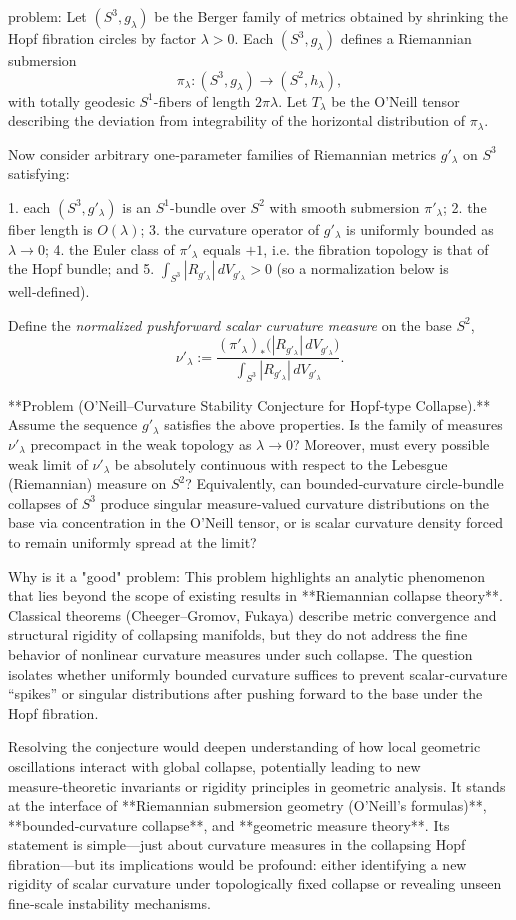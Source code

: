 problem:  
Let \( (S^3,g_\lambda) \) be the Berger family of metrics obtained by shrinking the Hopf fibration circles by factor \(\lambda>0\).  
Each \( (S^3,g_\lambda)\) defines a Riemannian submersion
\[
\pi_\lambda:(S^3,g_\lambda)\to (S^2,h_\lambda),
\]
with totally geodesic \(S^1\)-fibers of length \(2\pi\lambda\).  Let \(T_\lambda\) be the O’Neill tensor describing the deviation from integrability of the horizontal distribution of \(\pi_\lambda\).

Now consider arbitrary one‑parameter families of Riemannian metrics \(g'_\lambda\) on \(S^3\) satisfying:

1. each \( (S^3,g'_\lambda)\) is an \(S^1\)-bundle over \(S^2\) with smooth submersion \(\pi'_\lambda\);  
2. the fiber length is \(O(\lambda)\);  
3. the curvature operator of \(g'_\lambda\) is uniformly bounded as \(\lambda\to0\);  
4. the Euler class of \(\pi'_\lambda\) equals \(+1\), i.e. the fibration topology is that of the Hopf bundle; and  
5. \(\int_{S^3} |R_{g'_\lambda}|\,dV_{g'_\lambda} > 0\) (so a normalization below is well‑defined).

Define the \emph{normalized pushforward scalar curvature measure} on the base \(S^2\),
\[
\nu'_\lambda := 
\frac{(\pi'_\lambda)_*\!\big(|R_{g'_\lambda}|\,dV_{g'_\lambda}\big)}
      {\int_{S^3} |R_{g'_\lambda}|\,dV_{g'_\lambda}}.
\]

**Problem (O’Neill–Curvature Stability Conjecture for Hopf‑type Collapse).**  
Assume the sequence \(g'_\lambda\) satisfies the above properties.  
Is the family of measures \(\nu'_\lambda\) precompact in the weak topology as \(\lambda\to0\)?  
Moreover, must every possible weak limit of \(\nu'_\lambda\) be absolutely continuous with respect to the Lebesgue (Riemannian) measure on \(S^2\)?  
Equivalently, can bounded‑curvature circle‑bundle collapses of \(S^3\) produce singular measure‑valued curvature distributions on the base via concentration in the O’Neill tensor, or is scalar curvature density forced to remain uniformly spread at the limit?

Why is it a "good" problem:  
This problem highlights an analytic phenomenon that lies beyond the scope of existing results in **Riemannian collapse theory**. Classical theorems (Cheeger–Gromov, Fukaya) describe metric convergence and structural rigidity of collapsing manifolds, but they do not address the fine behavior of nonlinear curvature measures under such collapse. The question isolates whether uniformly bounded curvature suffices to prevent scalar‑curvature “spikes” or singular distributions after pushing forward to the base under the Hopf fibration.  

Resolving the conjecture would deepen understanding of how local geometric oscillations interact with global collapse, potentially leading to new measure‑theoretic invariants or rigidity principles in geometric analysis. It stands at the interface of **Riemannian submersion geometry (O’Neill’s formulas)**, **bounded‑curvature collapse**, and **geometric measure theory**.  
Its statement is simple—just about curvature measures in the collapsing Hopf fibration—but its implications would be profound: either identifying a new rigidity of scalar curvature under topologically fixed collapse or revealing unseen fine‑scale instability mechanisms.